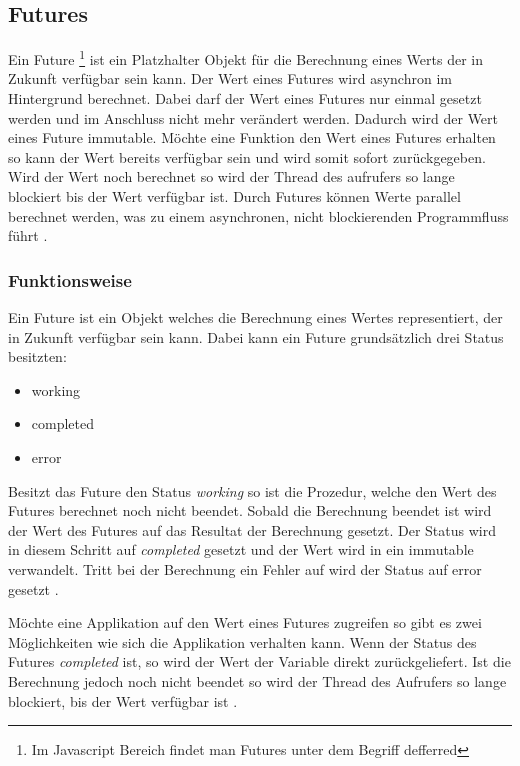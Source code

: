 \subsection{Futures}
\label{section:futures}

Ein Future \footnote{Im Javascript Bereich findet man Futures unter dem Begriff defferred} ist ein Platzhalter Objekt für die Berechnung eines Werts der in Zukunft verfügbar sein kann. Der Wert eines Futures wird asynchron im Hintergrund berechnet. Dabei darf der Wert eines Futures nur einmal gesetzt werden und im Anschluss nicht mehr verändert werden. Dadurch wird der Wert eines Future immutable. Möchte eine Funktion den Wert eines Futures erhalten so kann der Wert bereits verfügbar sein und wird somit sofort zurückgegeben. Wird der Wert noch berechnet so wird der Thread des aufrufers so lange blockiert bis der Wert verfügbar ist. Durch Futures können Werte parallel berechnet werden, was zu einem asynchronen, nicht blockierenden Programmfluss führt \cite[]{ScalaFutures}. 

\subsubsection{Funktionsweise} 

Ein Future ist ein Objekt welches die Berechnung eines Wertes representiert, der in Zukunft verfügbar sein kann. Dabei kann ein Future grundsätzlich drei Status besitzten: 

\begin{itemize}
  \item working
  \item completed
  \item error
\end{itemize}  
Besitzt das Future den Status \emph{working} so ist die Prozedur, welche den Wert des Futures berechnet noch nicht beendet. Sobald die Berechnung beendet ist wird der Wert des Futures auf das Resultat der Berechnung gesetzt. Der Status wird in diesem Schritt auf \emph{completed} gesetzt und der Wert wird in ein immutable verwandelt. Tritt bei der Berechnung ein Fehler auf wird der Status auf error gesetzt \cite[]{ScalaFutures}. 

Möchte eine Applikation auf den Wert eines Futures zugreifen so gibt es zwei Möglichkeiten wie sich die Applikation verhalten kann. Wenn der Status des Futures \emph{completed} ist, so wird der Wert der Variable direkt zurückgeliefert. Ist die Berechnung jedoch noch nicht beendet so wird der Thread des Aufrufers so lange blockiert, bis der Wert verfügbar ist \cite[]{ScalaFutures}.

